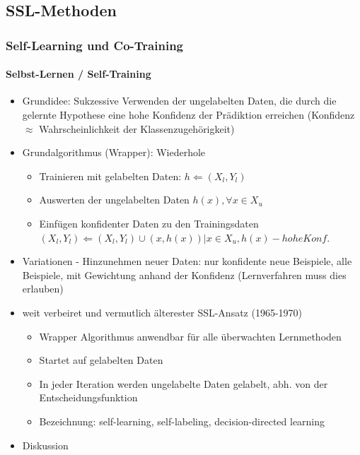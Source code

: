 \documentclass[paper=a4, fontsize=11pt]{scrartcl} %
\numberwithin{equation}{section} %
\numberwithin{figure}{section} %
\numberwithin{table}{section} %
\begin{document}
\subsection{SSL-Methoden}

\subsubsection{Self-Learning und Co-Training}

\paragraph{Selbst-Lernen / Self-Training}

\begin{itemize}
\item Grundidee: Sukzessive Verwenden der ungelabelten Daten, die durch die gelernte Hypothese eine hohe Konfidenz der Prädiktion erreichen (Konfidenz $\approx$ Wahrscheinlichkeit der Klassenzugehörigkeit)
\item Grundalgorithmus (Wrapper): Wiederhole
\begin{itemize}
\item Trainieren mit gelabelten Daten: $h \Leftarrow (X_l, Y_l)$
\item Auswerten der ungelabelten Daten $h(x), \forall x \in X_u$
\item Einfügen konfidenter Daten zu den Trainingsdaten\\ $(X_l, Y_l) \Leftarrow (X_l, Y_l) \cup {(x, h(x)) | x \in X_u, h(x) - hohe Konf.}$
\end{itemize}
\item Variationen - Hinzunehmen neuer Daten: nur konfidente neue Beispiele, alle Beispiele, mit Gewichtung anhand der Konfidenz (Lernverfahren muss dies erlauben)
\item weit verbeiret und vermutlich älterester SSL-Ansatz (1965-1970)
\begin{itemize}
\item Wrapper Algorithmus anwendbar für alle überwachten Lernmethoden
\item Startet auf gelabelten Daten
\item In jeder Iteration werden ungelabelte Daten gelabelt, abh. von der Entscheidungsfunktion
\item Bezeichnung: self-learning, self-labeling, decision-directed learning
\end{itemize}
\item Diskussion
\begin{itemize}

\end{itemize}
\end{itemize}
\end{document}
